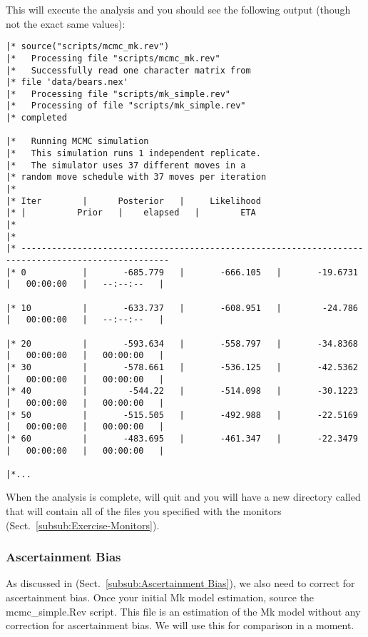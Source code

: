 This will execute the analysis and you should see the following output (though not the exact same values):


{\tiny{\tt \begin{snugshade*}
\begin{lstlisting}
|* source("scripts/mcmc_mk.rev")
|*   Processing file "scripts/mcmc_mk.rev"
|*   Successfully read one character matrix from
|* file 'data/bears.nex'
|*   Processing file "scripts/mk_simple.rev"
|*   Processing of file "scripts/mk_simple.rev"
|* completed

|*   Running MCMC simulation
|*   This simulation runs 1 independent replicate.
|*   The simulator uses 37 different moves in a
|* random move schedule with 37 moves per iteration
|*
|* Iter        |      Posterior   |     Likelihood  
|* |          Prior   |    elapsed   |        ETA   
|*
|*
|* ---------------------------------------------------------------------------------------------------
|* 0           |       -685.779   |       -666.105   |       -19.6731   |   00:00:00   |   --:--:--   |

|* 10          |       -633.737   |       -608.951   |        -24.786   |   00:00:00   |   --:--:--   |

|* 20          |       -593.634   |       -558.797   |       -34.8368   |   00:00:00   |   00:00:00   |
|* 30          |       -578.661   |       -536.125   |       -42.5362   |   00:00:00   |   00:00:00   |
|* 40          |        -544.22   |       -514.098   |       -30.1223   |   00:00:00   |   00:00:00   |
|* 50          |       -515.505   |       -492.988   |       -22.5169   |   00:00:00   |   00:00:00   |
|* 60          |       -483.695   |       -461.347   |       -22.3479   |   00:00:00   |   00:00:00   |

|*...
\end{lstlisting}
\end{snugshade*}}}

When the analysis is complete, \RevBayes will quit and you will have a new directory called  that will contain all of the files you specified with the monitors (Sect.\ \ref{subsub:Exercise-Monitors}).

\subsubsection{Ascertainment Bias}

As discussed in (Sect.\ \ref{subsub:Ascertainment Bias}), we also need to correct for ascertainment bias. 
Once your initial Mk model estimation, source the mcmc\_simple.Rev script. 
This file is an estimation of the Mk model without any correction for ascertainment bias. 
We will use this for comparison in a moment. \par


 

\newpage
